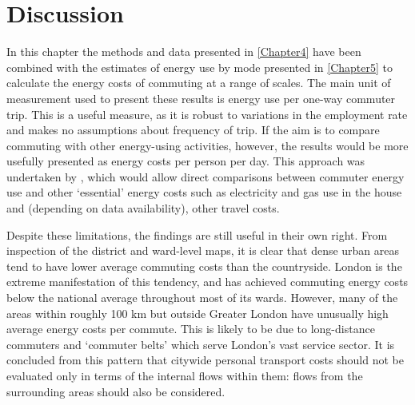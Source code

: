% 


% 
% 

\section{Discussion}
In this chapter the methods and data presented in
\cref{Chapter4} have been combined with the estimates of energy use by mode presented in
\cref{Chapter5} to calculate the energy costs of commuting at a range of scales.
The main unit of measurement used to present these results is
energy use per one-way commuter trip. This is a useful measure, as it is
robust to variations in the employment rate and makes no assumptions about
frequency of trip. If the aim is to compare commuting with other energy-using
activities, however, the results would be more usefully presented as energy
costs per person per day. This approach was undertaken
by \citet{Boussauw2009}, which would allow
direct comparisons between commuter energy use and other `essential'
energy costs such as electricity and gas use in the house and (depending on
data availability), other travel costs. %

Despite these limitations, the findings are still useful in their own right.
From inspection of the district and ward-level maps, it is clear that dense
urban areas tend to have lower average commuting costs than the countryside.
London is the extreme manifestation of this tendency, and has achieved
commuting energy costs below the national average throughout most of its
wards. However, many of the areas within roughly 100 km but outside
Greater London have unusually high  average energy costs per commute.
This is likely to be due to long-distance commuters and `commuter belts'
which serve London's vast service sector. It is concluded from this
pattern that citywide personal transport costs should not be evaluated
only in terms of the internal flows within them: flows from the surrounding
areas should also be considered.

